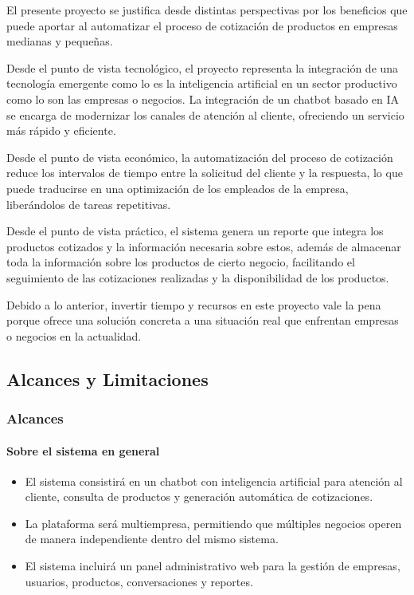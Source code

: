 El presente proyecto se justifica desde distintas perspectivas por los beneficios que puede aportar al automatizar el proceso de cotización de productos en empresas medianas y pequeñas.

Desde el punto de vista tecnológico, el proyecto representa la integración de una tecnología emergente como lo es la inteligencia artificial en un sector productivo como lo son las empresas o negocios. La integración de un chatbot basado en IA se encarga de modernizar los canales de atención al cliente, ofreciendo un servicio más rápido y eficiente.

Desde el punto de vista económico, la automatización del proceso de cotización reduce los intervalos de tiempo entre la solicitud del cliente y la respuesta, lo que puede traducirse en una optimización de los empleados de la empresa, liberándolos de tareas repetitivas.

Desde el punto de vista práctico, el sistema genera un reporte que integra los productos cotizados y la información necesaria sobre estos, además de almacenar toda la información sobre los productos de cierto negocio, facilitando el seguimiento de las cotizaciones realizadas y la disponibilidad de los productos.

Debido a lo anterior, invertir tiempo y recursos en este proyecto vale la pena porque ofrece una solución concreta a una situación real que enfrentan empresas o negocios en la actualidad.

\subsection{Alcances y Limitaciones}
\label{sec:alcances_limitaciones}

\subsubsection{Alcances}
\label{subsec:alcances}

\paragraph{Sobre el sistema en general}
\begin{itemize}
    \item El sistema consistirá en un chatbot con inteligencia artificial para atención al cliente, consulta de productos y generación automática de cotizaciones.
    \item La plataforma será multiempresa, permitiendo que múltiples negocios operen de manera independiente dentro del mismo sistema.
    \item El sistema incluirá un panel administrativo web para la gestión de empresas, usuarios, productos, conversaciones y reportes.
\end{itemize}
